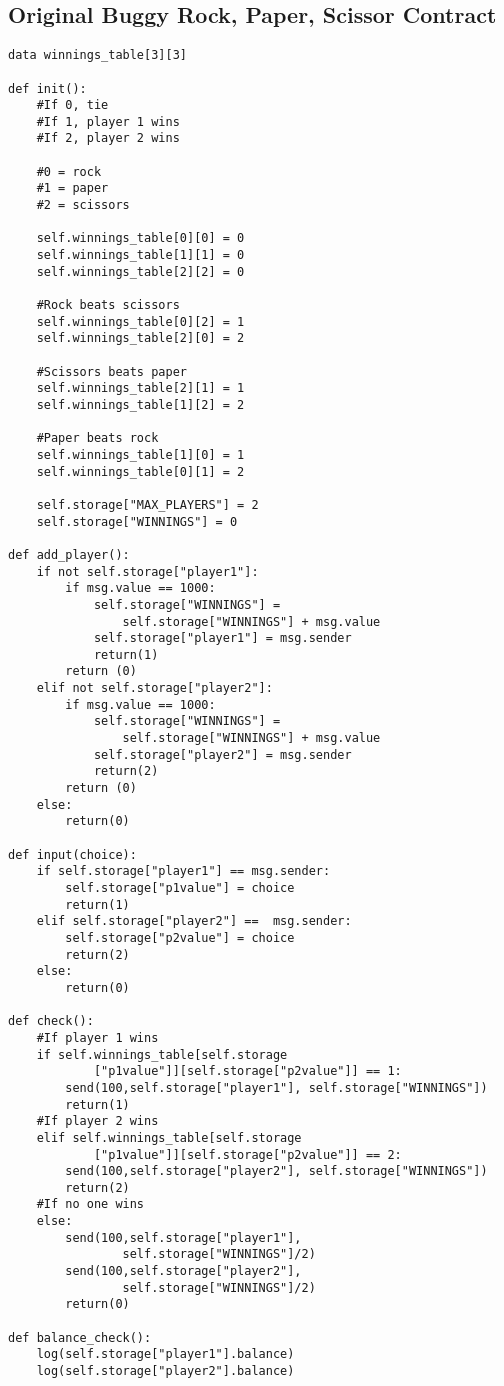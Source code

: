 \documentclass[12pt]{article}
\begin{document}
\subsection{Original Buggy Rock, Paper, Scissor Contract}

\begin{lstlisting}[frame=single]
data winnings_table[3][3]

def init():
	#If 0, tie
	#If 1, player 1 wins
	#If 2, player 2 wins

	#0 = rock
	#1 = paper
	#2 = scissors

	self.winnings_table[0][0] = 0
	self.winnings_table[1][1] = 0
	self.winnings_table[2][2] = 0

	#Rock beats scissors
	self.winnings_table[0][2] = 1
	self.winnings_table[2][0] = 2

	#Scissors beats paper
	self.winnings_table[2][1] = 1
	self.winnings_table[1][2] = 2

	#Paper beats rock
	self.winnings_table[1][0] = 1
	self.winnings_table[0][1] = 2

	self.storage["MAX_PLAYERS"] = 2
	self.storage["WINNINGS"] = 0

def add_player():
	if not self.storage["player1"]:
		if msg.value == 1000:
			self.storage["WINNINGS"] = 
				self.storage["WINNINGS"] + msg.value
			self.storage["player1"] = msg.sender
			return(1)
		return (0)
	elif not self.storage["player2"]:
		if msg.value == 1000:
			self.storage["WINNINGS"] = 
				self.storage["WINNINGS"] + msg.value
			self.storage["player2"] = msg.sender
			return(2)
		return (0)
	else:
		return(0)

def input(choice):
	if self.storage["player1"] == msg.sender:
		self.storage["p1value"] = choice
		return(1)
	elif self.storage["player2"] ==  msg.sender:
		self.storage["p2value"] = choice
		return(2)
	else:
		return(0)

def check():
	#If player 1 wins
	if self.winnings_table[self.storage
			["p1value"]][self.storage["p2value"]] == 1:
		send(100,self.storage["player1"], self.storage["WINNINGS"])
		return(1)
	#If player 2 wins
	elif self.winnings_table[self.storage
			["p1value"]][self.storage["p2value"]] == 2:
		send(100,self.storage["player2"], self.storage["WINNINGS"])
		return(2)
	#If no one wins
	else:
		send(100,self.storage["player1"], 
				self.storage["WINNINGS"]/2)
		send(100,self.storage["player2"], 
				self.storage["WINNINGS"]/2)
		return(0)

def balance_check():
	log(self.storage["player1"].balance)
	log(self.storage["player2"].balance)
\end{lstlisting}
\end{document}
